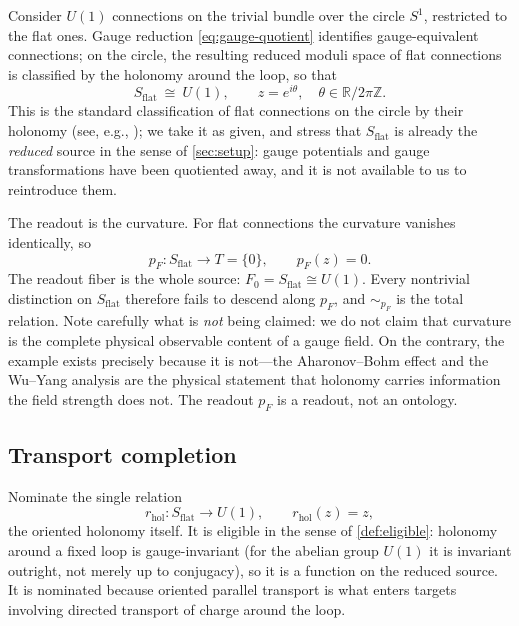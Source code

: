 \documentclass[11pt,reqno]{amsart}
\theoremstyle{plain}
\theoremstyle{definition}
\theoremstyle{remark}
\numberwithin{equation}{section}
\begin{document}
Consider $U(1)$ connections on the trivial bundle over the circle $S^1$, restricted to the flat ones.
Gauge reduction \eqref{eq:gauge-quotient} identifies gauge-equivalent connections; on the circle, the
resulting reduced moduli space of flat connections is classified by the holonomy around the loop, so
that
\begin{equation}
\label{eq:Sflat}
S_{\mathrm{flat}}\ \cong\ U(1),
\qquad
z=e^{i\theta},\quad\theta\in\mathbb{R}/2\pi\mathbb{Z} .
\end{equation}
This is the standard classification of flat connections on the circle by their holonomy
(see, e.g., \cite{KobayashiNomizu,WuYang}); we take it as given, and stress that $S_{\mathrm{flat}}$
is already the \emph{reduced} source in the sense of \cref{sec:setup}: gauge potentials and gauge
transformations have been quotiented away, and it is not available to us to reintroduce them.

The readout is the curvature. For flat connections the curvature vanishes identically, so
\begin{equation}
\label{eq:pF}
p_F\colon S_{\mathrm{flat}}\longrightarrow T=\{0\},
\qquad
p_F(z)=0 .
\end{equation}
The readout fiber is the whole source: $F_0=S_{\mathrm{flat}}\cong U(1)$. Every nontrivial
distinction on $S_{\mathrm{flat}}$ therefore fails to descend along $p_F$, and $\sim_{p_F}$ is the
total relation. Note carefully what is \emph{not} being claimed: we do not claim that curvature is
the complete physical observable content of a gauge field. On the contrary, the example exists
precisely because it is not---the Aharonov--Bohm effect \cite{AharonovBohm} and the Wu--Yang analysis
\cite{WuYang} are the physical statement that holonomy carries information the field strength does
not. The readout $p_F$ is a readout, not an ontology.

\subsection{Transport completion}

Nominate the single relation
\begin{equation}
\label{eq:rhol}
r_{\mathrm{hol}}\colon S_{\mathrm{flat}}\to U(1),
\qquad
r_{\mathrm{hol}}(z)=z ,
\end{equation}
the oriented holonomy itself. It is eligible in the sense of \cref{def:eligible}: holonomy around a
fixed loop is gauge-invariant (for the abelian group $U(1)$ it is invariant outright, not merely up
to conjugacy), so it is a function on the reduced source. It is nominated because oriented parallel
transport is what enters targets involving directed transport of charge around the loop.
\end{document}

